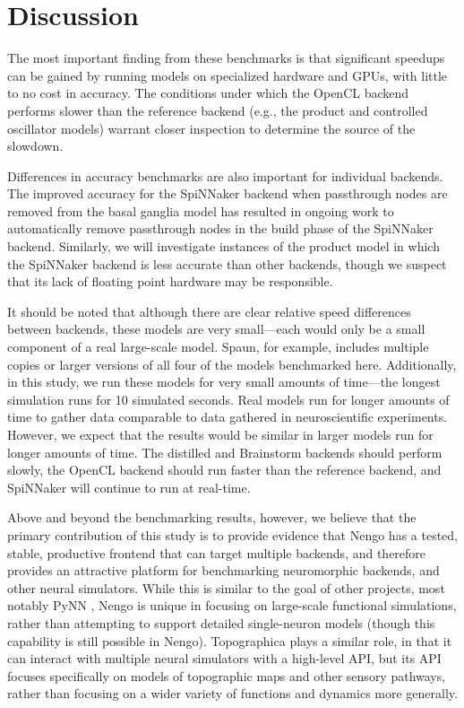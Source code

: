 \documentclass{frontiersSCNS}
\begin{document}
\section{Discussion}

The most important finding from these benchmarks
is that significant speedups can be gained by
running models on specialized hardware and GPUs,
with little to no cost in accuracy.
The conditions under which the OpenCL backend
performs slower than the reference backend
(e.g., the product and controlled oscillator models)
warrant closer inspection to determine the source
of the slowdown.

Differences in accuracy benchmarks
are also important for individual backends.
The improved accuracy
for the SpiNNaker backend
when passthrough nodes are removed
from the basal ganglia model
has resulted in ongoing work to
automatically remove passthrough nodes
in the build phase of the SpiNNaker backend.
Similarly, we will investigate
instances of the product model
in which the SpiNNaker backend
is less accurate than other backends,
though we suspect that its
lack of floating point hardware
may be responsible.

It should be noted that although there are clear
relative speed differences between backends,
these models are very small---each would only
be a small component of a real large-scale model.
Spaun, for example, includes multiple copies
or larger versions of all four of the models
benchmarked here.
Additionally, in this study, we run these models
for very small amounts of time---the longest
simulation runs for 10 simulated seconds.
Real models run for longer amounts of time
to gather data comparable to data gathered
in neuroscientific experiments.
However, we expect that the results
would be similar
in larger models run for longer amounts of time.
The distilled and Brainstorm backends should
perform slowly, the OpenCL backend should
run faster than the reference backend,
and SpiNNaker will continue to run at real-time.

Above and beyond the benchmarking results,
however, we believe that the primary contribution
of this study is to provide evidence that Nengo
has a tested, stable, productive frontend
that can target multiple backends,
and therefore provides an attractive platform
for benchmarking neuromorphic backends,
and other neural simulators.
While this is similar to the goal
of other projects, most notably PyNN \citep{davison2008},
Nengo is unique in focusing on
large-scale functional simulations,
rather than attempting to support
detailed single-neuron models
(though this capability is still possible in Nengo).
Topographica \citep{bednar2009} plays a similar role,
in that it can interact with multiple neural simulators
with a high-level API, but its API focuses specifically
on models of topographic maps
and other sensory pathways,
rather than focusing on
a wider variety of functions
and dynamics more generally.
\end{document}
